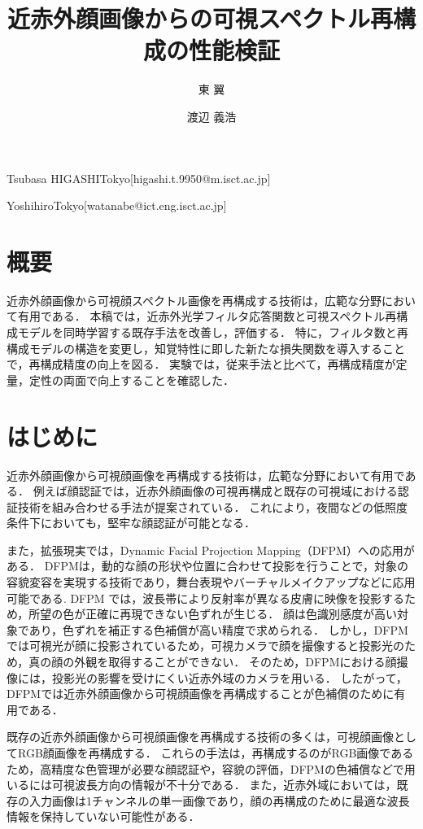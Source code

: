 \documentclass[MIRU,submit]{miru2026j}
\begin{document}
\title{近赤外顔画像からの可視スペクトル再構成の性能検証}


 \author{東 翼}{Tsubasa HIGASHI}{Tokyo}[higashi.t.9950@m.isct.ac.jp]
 \author{渡辺 義浩}{Yoshihiro}{Tokyo}[watanabe@ict.eng.isct.ac.jp]


\maketitle

\section*{概要}
近赤外顔画像から可視顔スペクトル画像を再構成する技術は，広範な分野において有用である．
本稿では，近赤外光学フィルタ応答関数と可視スペクトル再構成モデルを同時学習する既存手法を改善し，評価する．
特に，フィルタ数と再構成モデルの構造を変更し，知覚特性に即した新たな損失関数を導入することで，再構成精度の向上を図る．
実験では，従来手法と比べて，再構成精度が定量，定性の両面で向上することを確認した．

\section{はじめに}
近赤外顔画像から可視顔画像を再構成する技術は，広範な分野において有用である．
例えば顔認証では，近赤外顔画像の可視再構成と既存の可視域における認証技術を組み合わせる手法が提案されている\cite{art:he}．
これにより，夜間などの低照度条件下においても，堅牢な顔認証が可能となる．

また，拡張現実では，Dynamic Facial Projection Mapping（DFPM）への応用がある．
DFPMは，動的な顔の形状や位置に合わせて投影を行うことで，対象の容貌変容を実現する技術であり，舞台表現やバーチャルメイクアップなどに応用可能である\cite{art:peng}.
DFPM では，波長帯により反射率が異なる皮膚に映像を投影するため，所望の色が正確に再現できない色ずれが生じる．
顔は色識別感度が高い対象であり，色ずれを補正する色補償が高い精度で求められる．
しかし，DFPMでは可視光が顔に投影されているため，可視カメラで顔を撮像すると投影光のため，真の顔の外観を取得することができない．
そのため，DFPMにおける顔撮像には，投影光の影響を受けにくい近赤外域のカメラを用いる．
したがって，DFPMでは近赤外顔画像から可視顔画像を再構成することが色補償のために有用である．

既存の近赤外顔画像から可視顔画像を再構成する技術の多くは，可視顔画像としてRGB顔画像を再構成する\cite{art:he,proc:meng,proc:cai}．
これらの手法は，再構成するのがRGB画像であるため，高精度な色管理が必要な顔認証や，容貌の評価，DFPMの色補償などで用いるには可視波長方向の情報が不十分である．
また，近赤外域においては，既存の入力画像は1チャンネルの単一画像であり，顔の再構成のために最適な波長情報を保持していない可能性がある．
\end{document}
